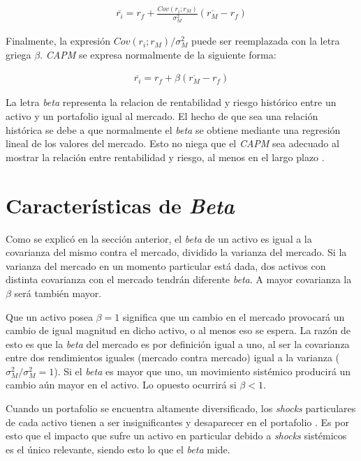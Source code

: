 \begin{align}
	\overline{r_i} = r_f + \frac{Cov(r_i; r_M)}{\sigma_M^2} ( \overline{r_M} - r_f )
\end{align}

Finalmente, la expresión $ Cov(r_i; r_M) / \sigma_M^2$ puede ser reemplazada con la letra griega $\beta$. \textit{CAPM} se expresa normalmente de la siguiente forma:

\begin{align}
	\overline{r_i} = r_f + \beta ( \overline{r_M} - r_f ) \label{capm}
\end{align}

La letra \textit{beta} representa la relacion de rentabilidad y riesgo histórico entre un activo y un portafolio igual al mercado. El hecho de que sea una relación histórica se debe a que normalmente el \textit{beta} se obtiene mediante una regresión lineal de los valores del mercado. Esto no niega que el \textit{CAPM} sea adecuado al mostrar la relación entre rentabilidad y riesgo, al menos en el largo plazo \cite[p.357]{elton}.


\section{Características de \textit{Beta}}

Como se explicó en la sección anterior, el \textit{beta} de un activo es igual a la covarianza del mismo contra el mercado, dividido la varianza del mercado. Si la varianza del mercado en un momento particular está dada, dos activos con distinta covarianza con el mercado tendrán diferente \textit{beta}. A mayor covarianza la $\beta$ será también mayor. 

Que un activo posea $\beta = 1$ significa que un cambio en el mercado provocará un cambio de igual magnitud en dicho activo, o al menos eso se espera. La razón de esto es que la \textit{beta} del mercado es por definición igual a uno, al ser la covarianza entre dos rendimientos iguales (mercado contra mercado) igual a la varianza ($\sigma_M^2 / \sigma_M^2 = 1$). Si el \textit{beta} es mayor que uno, un movimiento sistémico producirá un cambio aún mayor en el activo. Lo opuesto ocurrirá si $\beta < 1$.

Cuando un portafolio se encuentra altamente diversificado, los \textit{shocks} particulares de cada activo tienen a ser insignificantes y desaparecer en el portafolio \cite{sharp}. Es por esto que el impacto que sufre un activo en particular debido a \textit{shocks} sistémicos es el único relevante, siendo esto lo que el \textit{beta} mide.

